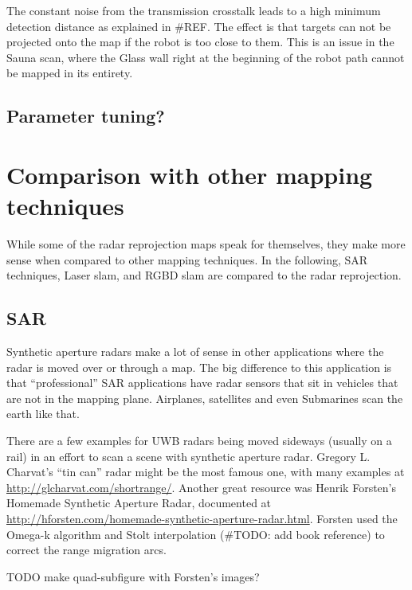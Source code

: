 The constant noise from the transmission crosstalk leads to a high
minimum detection distance as explained in \#REF. The effect is that
targets can not be projected onto the map if the robot is too close to
them. This is an issue in the Sauna scan, where the Glass wall right at
the beginning of the robot path cannot be mapped in its entirety.

\subsection{Parameter tuning?}\label{parameter-tuning}

\section{Comparison with other mapping
techniques}\label{comparison-with-other-mapping-techniques}

While some of the radar reprojection maps speak for themselves, they
make more sense when compared to other mapping techniques. In the
following, SAR techniques, Laser slam, and RGBD slam are compared to the
radar reprojection.

\subsection{SAR}\label{sar-1}

Synthetic aperture radars make a lot of sense in other applications
where the radar is moved over or through a map. The big difference to
this application is that ``professional'' SAR applications have radar
sensors that sit in vehicles that are not in the mapping plane.
Airplanes, satellites and even Submarines scan the earth like that.

There are a few examples for UWB radars being moved sideways (usually on
a rail) in an effort to scan a scene with synthetic aperture radar.
Gregory L. Charvat's ``tin can'' radar \cite{Charvat2014} might be the
most famous one, with many examples at \url{http://glcharvat.com/shortrange/}.
Another great resource was Henrik Forsten's Homemade Synthetic Aperture
Radar, documented at \url{http://hforsten.com/homemade-synthetic-aperture-radar.html}. Forsten used
the Omega-k algorithm \cite{Tolman2008} and Stolt interpolation (\#TODO:
add book reference) to correct the range migration arcs.

TODO make quad-subfigure with Forsten's images?

